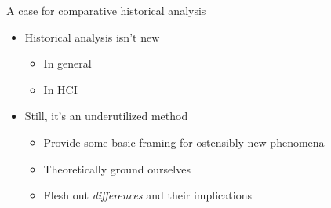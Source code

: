 \documentclass[presentation]{subfiles}
\begin{document}
\begin{frame}{A case for comparative historical analysis}
\begin{itemize}
  \item Historical analysis isn't new
  \begin{itemize}
    \item In general

    \scriptsize{
      \textcite{rosenberg1994exploring,rosenberg1982inside}
    }
    \item In HCI

    \scriptsize{
      \textcite{Wyche2006,bodker1993historical}
    }
  \end{itemize}
  \item Still, it's an underutilized method
  \begin{itemize}
    \item Provide some basic framing for ostensibly new phenomena
    \item Theoretically ground ourselves
    \item Flesh out \textit{differences} and their implications
  \end{itemize}
\end{itemize}
\end{frame}



\onlyinsubfile{
  \printbibliography{}
}
\end{document}
